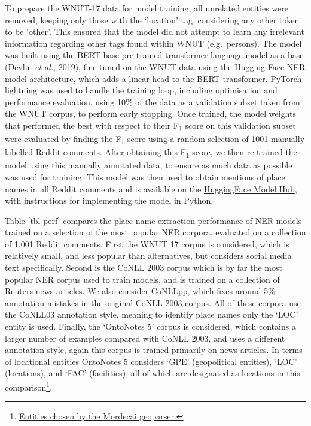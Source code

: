 \documentclass[
  letterpaper,
  11pt,
  english,
  onehalfspacing,
  headsepline]{MastersDoctoralThesis}
\begin{document}
To prepare the WNUT-17 data for model training, all unrelated entities
were removed, keeping only those with the `location' tag, considering
any other token to be `other'. This ensured that the model did not
attempt to learn any irrelevant information regarding other tags found
within WNUT (e.g.~persons). The model was built using the BERT-base
pre-trained transformer language model as a base (Devlin \emph{et al.},
2019), fine-tuned on the WNUT data using the Hugging Face NER model
architecture, which adds a linear head to the BERT transformer. PyTorch
lightning was used to handle the training loop, including optimisation
and performance evaluation, using 10\% of the data as a validation
subset taken from the WNUT corpus, to perform early stopping. Once
trained, the model weights that performed the best with respect to their
F\textsubscript{1} score on this validation subset were evaluated by
finding the F\textsubscript{1} score using a random selection of 1001
manually labelled Reddit comments. After obtaining this
F\textsubscript{1} score, we then re-trained the model using this
manually annotated data, to ensure as much data as possible was used for
training. This model was then used to obtain mentions of place names in
all Reddit comments and is available on the
\href{https://huggingface.co/cjber/reddit-ner-place_names}{HuggingFace
Model Hub}, with instructions for implementing the model in Python.

Table \ref{tbl-perf} compares the place name extraction performance of
NER models trained on a selection of the most popular NER corpora,
evaluated on a collection of 1,001 Reddit comments. First the WNUT 17
corpus is considered, which is relatively small, and less popular than
alternatives, but considers social media text specifically. Second is
the CoNLL 2003 corpus which is by far the most popular NER corpus used
to train models, and is trained on a collection of Reuters news
articles. We also consider CoNLLpp, which fixes around 5\% annotation
mistakes in the original CoNLL 2003 corpus. All of these corpora use the
CoNLL03 annotation style, meaning to identify place names only the `LOC'
entity is used. Finally, the `OntoNotes 5' corpus is considered, which
contains a larger number of examples compared with CoNLL 2003, and uses
a different annotation style, again this corpus is trained primarily on
news articles. In terms of locational entities OntoNotes 5 considers
`GPE' (geopolitical entities), `LOC' (locations), and `FAC'
(facilities), all of which are designated as locations in this
comparison\footnote{\href{https://github.com/openeventdata/mordecai/blob/9d37110f6cd1275852548fc53fd7a21bb77593f9/mordecai/geoparse.py\#L511}{Entities
  chosen by the Mordecai geoparser.}}.
\end{document}
